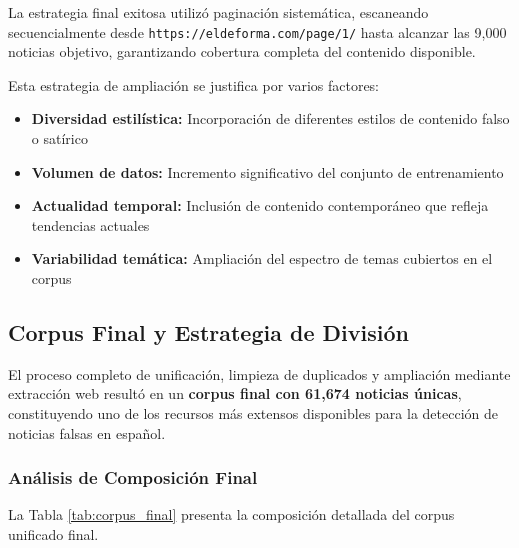 La estrategia final exitosa utilizó paginación sistemática, escaneando secuencialmente desde \texttt{https://eldeforma.com/page/1/} hasta alcanzar las 9,000 noticias objetivo, garantizando cobertura completa del contenido disponible.

Esta estrategia de ampliación se justifica por varios factores:
\begin{itemize}
    \item \textbf{Diversidad estilística:} Incorporación de diferentes estilos de contenido falso o satírico
    \item \textbf{Volumen de datos:} Incremento significativo del conjunto de entrenamiento
    \item \textbf{Actualidad temporal:} Inclusión de contenido contemporáneo que refleja tendencias actuales
    \item \textbf{Variabilidad temática:} Ampliación del espectro de temas cubiertos en el corpus
\end{itemize}

\subsection{Corpus Final y Estrategia de División}

El proceso completo de unificación, limpieza de duplicados y ampliación mediante extracción web resultó en un \textbf{corpus final con 61,674 noticias únicas}, constituyendo uno de los recursos más extensos disponibles para la detección de noticias falsas en español.

\subsubsection{Análisis de Composición Final}

La Tabla \ref{tab:corpus_final} presenta la composición detallada del corpus unificado final.

\begin{table}[htbp]
\centering
{}
\caption{Composición final del corpus unificado después del procesamiento completo.}
\label{tab:corpus_final}
\end{table}


